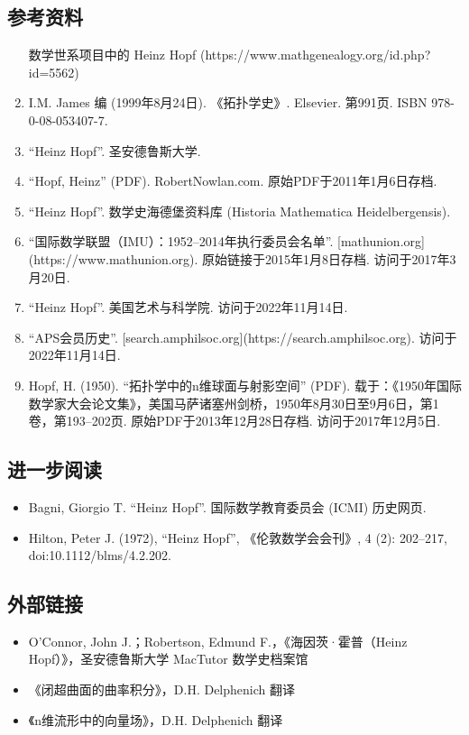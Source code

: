 \subsection{参考资料}
\begin{enumerate}
\item [数学世系项目中的 Heinz Hopf](https://www.mathgenealogy.org/id.php?id=5562)
\item I.M. James 编 (1999年8月24日). 《拓扑学史》. Elsevier. 第991页. ISBN 978-0-08-053407-7.
\item “Heinz Hopf”. 圣安德鲁斯大学.
\item “Hopf, Heinz” (PDF). RobertNowlan.com. 原始PDF于2011年1月6日存档.
\item “Heinz Hopf”. 数学史海德堡资料库 (Historia Mathematica Heidelbergensis).
\item “国际数学联盟（IMU）：1952–2014年执行委员会名单”. [mathunion.org](https://www.mathunion.org). 原始链接于2015年1月8日存档. 访问于2017年3月20日.
\item “Heinz Hopf”. 美国艺术与科学院. 访问于2022年11月14日.
\item “APS会员历史”. [search.amphilsoc.org](https://search.amphilsoc.org). 访问于2022年11月14日.
\item Hopf, H. (1950). “拓扑学中的n维球面与射影空间” (PDF). 载于：《1950年国际数学家大会论文集》，美国马萨诸塞州剑桥，1950年8月30日至9月6日，第1卷，第193–202页. 原始PDF于2013年12月28日存档. 访问于2017年12月5日.
\end{enumerate}
\subsection{进一步阅读}
\begin{itemize}
\item Bagni, Giorgio T. “Heinz Hopf”. 国际数学教育委员会 (ICMI) 历史网页.
\item Hilton, Peter J. (1972), “Heinz Hopf”, 《伦敦数学会会刊》, 4 (2): 202–217, doi:10.1112/blms/4.2.202.
\end{itemize}
\subsection{外部链接}
\begin{itemize}
\item O'Connor, John J.；Robertson, Edmund F.，《海因茨·霍普（Heinz Hopf）》，圣安德鲁斯大学 MacTutor 数学史档案馆
\item 《闭超曲面的曲率积分》，D.H. Delphenich 翻译
\item 《n维流形中的向量场》，D.H. Delphenich 翻译
\end{itemize}